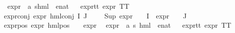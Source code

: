 \begin{isabellebody}
\isanewline
\isanewline
{}\isamarkupfalse%
\ expr{\isacharunderscore}{\kern0pt}{}\ {\isacharcolon}{\kern0pt}{\isacharcolon}{\kern0pt}\ {\isachardoublequoteopen}{\isacharparenleft}{\kern0pt}{\isacharprime}{\kern0pt}a{\isacharcomma}{\kern0pt}\ {\isacharprime}{\kern0pt}s{\isacharparenright}{\kern0pt}hml\ {\isasymRightarrow}\ enat{\isachardoublequoteclose}\isanewline
\ \ \isanewline
expr{\isacharunderscore}{\kern0pt}{}{\isacharunderscore}{\kern0pt}tt{\isacharcolon}{\kern0pt}\ {\isacartoucheopen}expr{\isacharunderscore}{\kern0pt}{}\ TT\ {\isacharequal}{\kern0pt}\ {}{\isacartoucheclose}\ {\isacharbar}{\kern0pt}\isanewline
expr{\isacharunderscore}{\kern0pt}{}{\isacharunderscore}{\kern0pt}conj{\isacharcolon}{\kern0pt}\ {\isacartoucheopen}expr{\isacharunderscore}{\kern0pt}{}\ {\isacharparenleft}{\kern0pt}hml{\isacharunderscore}{\kern0pt}conj\ I\ J\ {\isasymPhi}{\isacharparenright}{\kern0pt}\ {\isacharequal}{\kern0pt}\ {}\ {\isacharplus}{\kern0pt}\ Sup\ {\isacharparenleft}{\kern0pt}{\isacharparenleft}{\kern0pt}expr{\isacharunderscore}{\kern0pt}{}\ {\isasymcirc}\ {\isasymPhi}{\isacharparenright}{\kern0pt}\ {\isacharbackquote}{\kern0pt}\ I\ {\isasymunion}\ {\isacharparenleft}{\kern0pt}expr{\isacharunderscore}{\kern0pt}{}\ {\isasymcirc}\ {\isasymPhi}{\isacharparenright}{\kern0pt}\ {\isacharbackquote}{\kern0pt}\ J{\isacharparenright}{\kern0pt}{\isacartoucheclose}\ {\isacharbar}{\kern0pt}\isanewline
expr{\isacharunderscore}{\kern0pt}{}{\isacharunderscore}{\kern0pt}pos{\isacharcolon}{\kern0pt}\ {\isacartoucheopen}expr{\isacharunderscore}{\kern0pt}{}\ {\isacharparenleft}{\kern0pt}hml{\isacharunderscore}{\kern0pt}pos\ {\isasymalpha}\ {\isasymphi}{\isacharparenright}{\kern0pt}\ {\isacharequal}{\kern0pt}\ expr{\isacharunderscore}{\kern0pt}{}\ {\isasymphi}{\isacartoucheclose}\isanewline
\isanewline
\isanewline
{}\isamarkupfalse%
\ expr{\isacharunderscore}{\kern0pt}{}\ {\isacharcolon}{\kern0pt}{\isacharcolon}{\kern0pt}\ {\isachardoublequoteopen}{\isacharparenleft}{\kern0pt}{\isacharprime}{\kern0pt}a{\isacharcomma}{\kern0pt}\ {\isacharprime}{\kern0pt}s{\isacharparenright}{\kern0pt}\ hml\ {\isasymRightarrow}\ enat{\isachardoublequoteclose}\isanewline
\ \ \isanewline
expr{\isacharunderscore}{\kern0pt}{}{\isacharunderscore}{\kern0pt}tt{\isacharcolon}{\kern0pt}\ {\isacartoucheopen}expr{\isacharunderscore}{\kern0pt}{}\ TT\ {\isacharequal}{\kern0pt}\ {}{\isacartoucheclose}\ {\isacharbar}{\kern0pt}\isanewline

\end{isabellebody}
